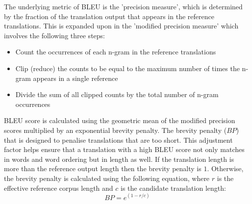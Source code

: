 

The underlying metric of \acrshort{BLEU} is the 'precision measure', which is determined by the fraction of the translation output that appears in the reference translations. This is expanded upon in the 'modified precision measure' which involves the following three steps:
\begin{itemize}
    \item Count the occurrences of each n-gram in the reference translations
    \item Clip (reduce) the counts to be equal to the maximum number of times the n-gram appears in a single reference
    \item Divide the sum of all clipped counts by the total number of n-gram occurrences
\end{itemize}

\acrshort{BLEU} score is calculated using the geometric mean of the modified precision scores multiplied by an exponential brevity penalty.
The brevity penalty ($BP$) that is designed to penalise translations that are too short. This adjustment factor helps ensure that a translation with a high \acrshort{BLEU} score not only matches in words and word ordering but in length as well.
If the translation length is more than the reference output length then the brevity penalty is $1$. Otherwise, the brevity penalty is calculated using the following equation, where $r$ is the effective reference corpus length and $c$ is the candidate translation length:
\begin{equation}
    BP = e^{(1-r/c)}
\end{equation}


